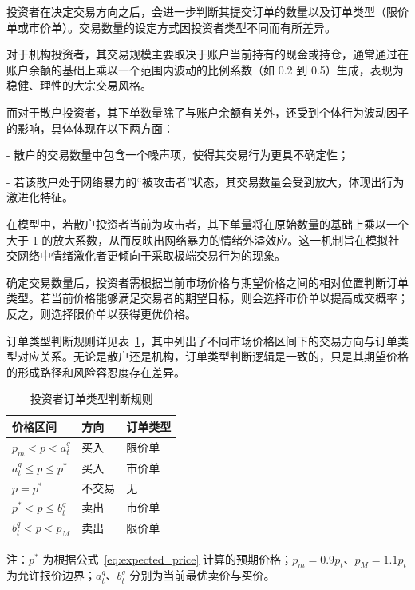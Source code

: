 投资者在决定交易方向之后，会进一步判断其提交订单的数量以及订单类型（限价单或市价单）。交易数量的设定方式因投资者类型不同而有所差异。

对于机构投资者，其交易规模主要取决于账户当前持有的现金或持仓，通常通过在账户余额的基础上乘以一个范围内波动的比例系数（如 0.2 到 0.5）生成，表现为稳健、理性的大宗交易风格。

而对于散户投资者，其下单数量除了与账户余额有关外，还受到个体行为波动因子的影响，具体体现在以下两方面：

- 散户的交易数量中包含一个噪声项，使得其交易行为更具不确定性；

- 若该散户处于网络暴力的“被攻击者”状态，其交易数量会受到放大，体现出行为激进化特征。

在模型中，若散户投资者当前为攻击者，其下单量将在原始数量的基础上乘以一个大于 1 的放大系数，从而反映出网络暴力的情绪外溢效应。这一机制旨在模拟社交网络中情绪激化者更倾向于采取极端交易行为的现象。

确定交易数量后，投资者需根据当前市场价格与期望价格之间的相对位置判断订单类型。若当前价格能够满足交易者的期望目标，则会选择市价单以提高成交概率；反之，则选择限价单以获得更优价格。

订单类型判断规则详见表~\ref{tab:order_decision}，其中列出了不同市场价格区间下的交易方向与订单类型对应关系。无论是散户还是机构，订单类型判断逻辑是一致的，只是其期望价格的形成路径和风险容忍度存在差异。

\begin{table}[htbp]
    \renewcommand{\arraystretch}{1.5}
    \centering
    \large
    \begin{threeparttable}
    \begin{tabular}{@{} >{\centering\arraybackslash}p{5.5cm} 
                    >{\centering\arraybackslash}p{3.5cm} 
                    >{\centering\arraybackslash}p{5.5cm} @{}}
    \toprule\toprule
    \textbf{价格区间} & \textbf{方向} & \textbf{订单类型} \\
    \midrule
    \( p_m < p < a_t^q \) & 买入 & 限价单 \\
    \( a_t^q \leq p \leq p^* \) & 买入 & 市价单 \\
    \( p = p^* \) & 不交易 & 无 \\
    \( p^* < p \leq b_t^q \) & 卖出 & 市价单 \\
    \( b_t^q < p < p_M \) & 卖出 & 限价单 \\
    \bottomrule\bottomrule
    \end{tabular}
    
    \vspace{1em}
    
    \begin{tablenotes}
    \item[] 注：\( p^* \) 为根据公式~\ref{eq:expected_price} 计算的预期价格；\( p_m = 0.9p_t \)、\( p_M = 1.1p_t \) 为允许报价边界；\( a_t^q \)、\( b_t^q \) 分别为当前最优卖价与买价。
    \end{tablenotes}
    
    \caption{投资者订单类型判断规则}
    \label{tab:order_decision}
    \end{threeparttable}
    \end{table}
    
